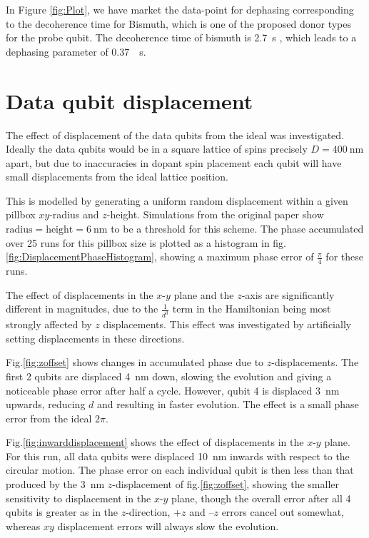 In Figure \ref{fig:Plot}, we have market the data-point for dephasing corresponding to the decoherence time for Bismuth, which is one of the proposed donor types for the probe qubit. The decoherence time of bismuth is \SI{2.7}{\second} \cite{Wolfowicz2013}, which leads to a dephasing parameter of \SI{0.37}{\per\second}. 



\clearpage
\section{Data qubit displacement}
The effect of displacement of the data qubits from the ideal was investigated. Ideally the data qubits would be in a square lattice of spins precisely $D = \SI{400}{\nano\metre}$ apart, but due to inaccuracies in dopant spin placement each qubit will have small displacements from the ideal lattice position.

This is modelled by generating a uniform random displacement within a given pillbox $xy$-radius and $z$-height. Simulations from the original paper show $\textrm{radius} = \textrm{height} = \SI{6}{\nano\metre}$ to be a threshold for this scheme. The phase accumulated over 25 runs for this pillbox size is plotted as a histogram in fig.\@ \ref{fig:DisplacementPhaseHistogram}, showing a maximum phase error of $\tfrac{\pi}{4}$ for these runs. 



The effect of displacements in the $x$-$y$ plane and the $z$-axis are significantly different in magnitudes, due to the $\tfrac{1}{d^3}$ term in the Hamiltonian being most strongly affected by $z$ displacements. This effect was investigated by artificially setting displacements in these directions.

Fig.\@ \ref{fig:zoffset} shows changes in accumulated phase due to $z$-displacements. The first 2 qubits are displaced \SI{4}{\nano\metre} down, slowing the evolution and giving a noticeable phase error after half a cycle. However, qubit 4 is displaced \SI{3}{\nano\metre} upwards, reducing $d$ and resulting in faster evolution. The effect is a small phase error from the ideal $2\pi$.

Fig.\@ \ref{fig:inwarddisplacement} shows the effect of displacements in the $x$-$y$ plane. For this run, all data qubits were displaced \SI{10}{\nano\metre} inwards with respect to the circular motion. The phase error on each individual qubit is then less than that produced by the \SI{3}{\nano\metre} $z$-displacement of fig.\@ \ref{fig:zoffset}, showing the smaller sensitivity to displacement in the $x$-$y$ plane, though the overall error after all 4 qubits is greater as in the $z$-direction, +$z$ and --$z$ errors cancel out somewhat, whereas $xy$ displacement errors will always slow the evolution.

